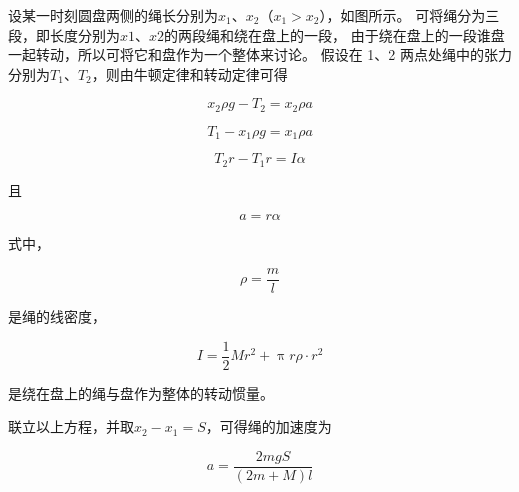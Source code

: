 \documentclass[12pt, a4paper]{article}
\numberwithin{equation}{section}
\begin{document}
    设某一时刻圆盘两侧的绳长分别为\(x_1\)、\(x_2\)（\(x_1 > x_2\)），如图所示。
    可将绳分为三段，即长度分别为\(x1\)、\(x2\)的两段绳和绕在盘上的一段，
    由于绕在盘上的一段谁盘一起转动，所以可将它和盘作为一个整体来讨论。
    假设在 1、2 两点处绳中的张力分别为\(T_1\)、\(T_2\)，则由牛顿定律和转动定律可得

    \[
        x_2 \rho g - T_2 = x_2 \rho a
    \]

    \[
        T_1 - x_1 \rho g = x_1 \rho a
    \]

    \[
        T_2r - T_1r = I \alpha
    \]

    且

    \[
        a = r\alpha
    \]

    式中，

    \[
        \rho = \frac{m}{l}
    \]

    是绳的线密度，

    \[
        I = \frac{1}{2}Mr^2 + \uppi r \rho \cdot r^2
    \]

    是绕在盘上的绳与盘作为整体的转动惯量。

    联立以上方程，并取\(x_2-x_1=S\)，可得绳的加速度为

    $$
        a=\frac{2 m g S}{(2 m+M) l}
    $$
\end{document}
